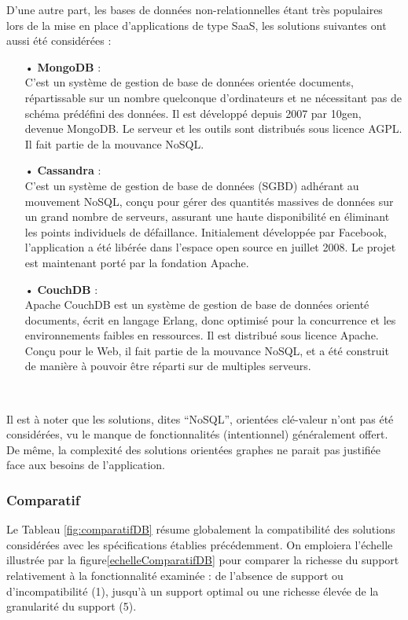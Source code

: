 \begin{spacing}{1.5}
D’une autre part, les bases de données non-relationnelles étant très populaires lors de la mise en place d’applications de type SaaS, les solutions suivantes ont aussi été considérées :
\begin{itemize}
    \item[•] \textbf{MongoDB} :\\
C’est un système de gestion de base de données orientée documents, répartissable sur un nombre quelconque d'ordinateurs et ne nécessitant pas de schéma prédéfini des données. Il est développé depuis 2007 par 10gen, devenue MongoDB. Le serveur et les outils sont distribués sous licence AGPL. Il fait partie de la mouvance NoSQL.
    \item[•] \textbf{Cassandra} :\\
C’est un système de gestion de base de données (SGBD) adhérant au mouvement NoSQL, conçu pour gérer des quantités massives de données sur un grand nombre de serveurs, assurant une haute disponibilité en éliminant les points individuels de défaillance. Initialement développée par Facebook, l'application a été libérée dans l'espace open source en juillet 2008. Le projet est maintenant porté par la fondation Apache.
    \item[•] \textbf{CouchDB} :\\
Apache CouchDB est un système de gestion de base de données orienté documents, écrit en langage Erlang, donc optimisé pour la concurrence et les environnements faibles en ressources. Il est distribué sous licence Apache. Conçu pour le Web, il fait partie de la mouvance NoSQL, et a été construit de manière à pouvoir être réparti sur de multiples serveurs.
\end{itemize}
\

Il est à noter que les solutions, dites “NoSQL”, orientées clé-valeur n’ont pas été considérées, vu le manque de fonctionnalités (intentionnel) généralement offert. De même, la complexité des solutions orientées graphes ne parait pas justifiée face aux besoins de l’application.

\subsubsection{Comparatif}%
Le Tableau \ref{fig:comparatifDB} résume globalement la compatibilité des solutions considérées avec les spécifications établies précédemment.
On emploiera l’échelle illustrée par la figure\ref{echelleComparatifDB} pour comparer la richesse du support relativement à la fonctionnalité examinée :  de l’absence de support ou d’incompatibilité (1), jusqu’à un support optimal ou une richesse élevée de la granularité du support (5).


\end{spacing}
